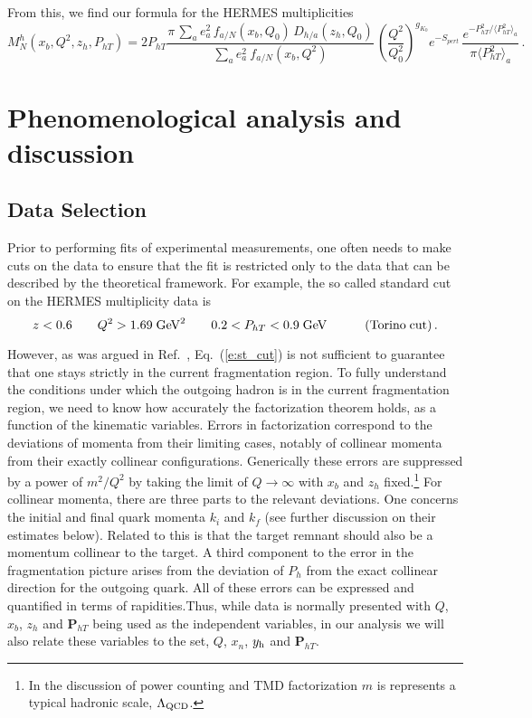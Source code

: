 \documentclass[final,3p,times,onecolumn,sort&compress,hidelinks]{elsarticle}
\newcommand{\xbj}{x_b}
\newcommand{\zh}{z_h}
\newcommand{\xn}{x_n}
\newcommand{\hady}{\ensuremath{y_{\rm h}}}
\begin{document}
From this, we find our formula for the HERMES multiplicities~\cite{Airapetian:2012ki} 
\begin{equation}
M_N^h(\xbj, Q^2,\zh, P_{hT}) =
2P_{hT}\frac{\pi\, \sum_{a} e_a^2 \,f_{a/N}(\xbj, Q_0)\,D_{h/a}(\zh, Q_0)}
{\sum_{a} e_a^2 \> f_{a/N} (\xbj,Q^2)} \,  \left( \frac{Q^2}{Q_0^2}\right)^{g_{K_0}}e^{-S_{pert}}\,
\frac{e^{-P_{hT}^2/\langle P_{hT}^2 \rangle_a}}{\pi\langle P_{hT}^2 \rangle_a}
\,. \label{e:mult_HERMES}
\end{equation}


\section{Phenomenological analysis and discussion}
\label{s:phenom}

\subsection{Data Selection}
\label{s:data}

Prior to performing  fits of  experimental measurements, one often needs to make cuts on the data to ensure that the fit is restricted only to the data that can be described by the theoretical  framework.  For example, the so called standard cut on the HERMES multiplicity data is~\cite{Anselmino:2013lza}
\begin{equation}
z < 0.6 \quad\quad Q^2 > 1.69 \; \textrm{GeV}^2  
\quad\quad 0.2 < P_{hT} < 0.9 \; \textrm{GeV} \quad\quad\quad{\rm (Torino\;cut)}\,.\label{e:st_cut}
\end{equation}

However, as was argued in Ref.~\cite{Boglione:2016bph}, Eq.~(\ref{e:st_cut}) is not sufficient to guarantee that one stays strictly in the current fragmentation region. To fully understand the conditions under which the outgoing hadron is in the current fragmentation region, we need to know how accurately the factorization theorem holds, as a function of the kinematic variables.
Errors in factorization correspond to the deviations of momenta
from their limiting cases, notably of collinear momenta from their
exactly collinear configurations.  Generically these errors are suppressed
by a power of $m^2/Q^2$ by taking the limit of $Q\rightarrow \infty$ with $\xbj$ and $\zh$ fixed.\footnote{In the discussion of power counting and TMD factorization $m$ is
  represents a typical hadronic scale, $\Lambda_{\rm QCD}$.}  For collinear momenta, there are
three parts to the relevant deviations.
One concerns the initial and final
quark momenta $k_i$ and $k_f$ (see further discussion on their estimates below).
 Related to this is that the target remnant should also be a momentum collinear to the target.   A third component to the error in the fragmentation picture arises from the deviation of $P_h$ from the exact collinear direction for the outgoing quark. All of these errors can be expressed and quantified  in terms of rapidities.Thus,  while data is normally presented with $Q$, $\xbj$, $\zh$ and ${\bm P}_{hT}$ being used as the independent variables, in our analysis we will also relate these variables to the set,
 $Q$, $\xn$, $\hady$ and ${\bm P}_{hT}$. 
 
\end{document}
